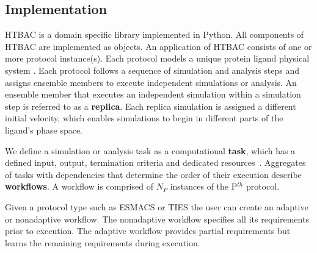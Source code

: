 


\subsection{Implementation}


HTBAC is a domain specific library implemented in Python. All components of 
HTBAC are implemented as objects. An application of HTBAC consists of one or 
more protocol instance(s). Each protocol models a unique protein ligand physical 
system . 
Each protocol follows a sequence of simulation and analysis steps and assigns ensemble 
members to execute independent simulations or analysis. An ensemble member 
that executes an independent simulation within a simulation step is referred to 
as a \textbf{replica}. Each replica simulation is assigned a different initial 
velocity, which enables simulations to begin in different parts of the ligand's 
phase space. 

We define a simulation or analysis task as a computational \textbf{task}, which 
has a defined input, output, termination criteria and dedicated 
resources~\cite{power-of-many17}. Aggregates of tasks with dependencies that 
determine the order of their execution describe \textbf{workflows}. A workflow 
is comprised of $N_P$ instances of the P$^{th}$ protocol.

Given a protocol type such as ESMACS or TIES the user can create an adaptive or
nonadaptive workflow. The nonadaptive workflow specifies all its requirements 
prior to execution. The adaptive workflow provides partial requirements but 
learns the remaining requirements during execution. 

